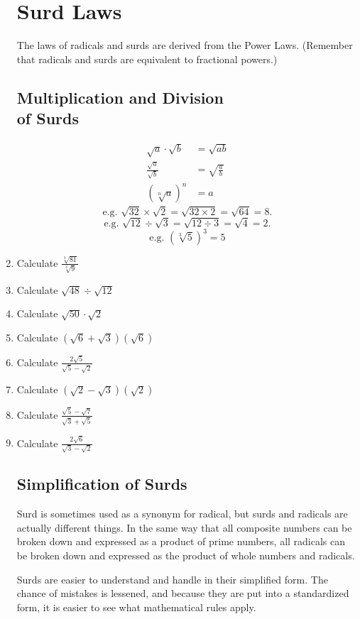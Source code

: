 \documentclass{article}
\begin{document}
\begin{enumerate}
\section*{Surd Laws}

The laws of radicals and surds are derived from the Power Laws. (Remember that radicals and surds are equivalent to fractional powers.)

\subsection*{Multiplication and Division\\ of Surds}
\begin{align*}
\sqrt{a} \cdot \sqrt{b}&=\sqrt{ab}\\
\frac{\sqrt{a}}{\sqrt{b}}&=\sqrt{\frac{a}{b}}\\
(\sqrt[n]{a})^n&=a
\end{align*}
$$\text{e.g. }\sqrt{32}\times\sqrt{2}=\sqrt{32\times2}=\sqrt{64}=8.$$
$$\text{e.g. }\sqrt{12}\div\sqrt{3}=\sqrt{12\div3}=\sqrt{4}=2.$$
$$\text{e.g. }(\sqrt[3]{5})^3=5$$

\item Calculate $\frac{\sqrt[3]{81}}{\sqrt[3]{9}}$
\item Calculate $\sqrt{48}\div\sqrt{12}$
\item Calculate $\sqrt{50}\cdot\sqrt{2}$
\item Calculate $(\sqrt{6} + \sqrt{3})(\sqrt{6})$
\item Calculate $\frac{2\sqrt{5}}{\sqrt{5} - \sqrt{2}}$
\item Calculate $(\sqrt{2} - \sqrt{3})(\sqrt{2})$
\item Calculate $\frac{\sqrt{5} - \sqrt{7}}{\sqrt{3} + \sqrt{5}}$
\item Calculate $\frac{2\sqrt{6}}{\sqrt{3} - \sqrt{2}}$

\subsection*{Simplification of Surds}

Surd is sometimes used as a synonym for radical, but surds and radicals are actually different things. In the same way that all composite numbers can be broken down and expressed as a product of prime numbers, all radicals can be broken down and expressed as the product of whole numbers and radicals.

Surds are easier to understand and handle in their simplified form. The chance of mistakes is lessened, and because they are put into a standardized form, it is easier to see what mathematical rules apply.


\end{enumerate}
\end{document}

